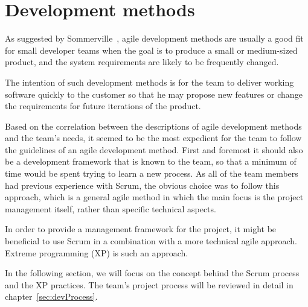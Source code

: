 \section{Development methods}
\label{sec:devMethods}

As suggested by Sommerville~\cite{scrum}, agile development methods are usually a good fit for small developer teams when the goal is to produce a small or medium-sized product, and the system requirements are likely to be frequently changed.

The intention of such development methods is for the team to deliver working software quickly to the customer so that he may propose new features or change the requirements for future iterations of the product.

Based on the correlation between the descriptions of agile development methods and the team's needs, it seemed to be the most expedient for the team to follow the guidelines of an agile development method. First and foremost it should also be a development framework that is known to the team, so that a minimum of time would be spent trying to learn a new process. As all of the team members had previous experience with Scrum, the obvious choice was to follow this approach, which is a general agile method in which the main focus is the project management itself, rather than specific technical aspects.

In order to provide a management framework for the project, it might be beneficial to use Scrum in a combination with a more technical agile approach. Extreme programming (XP) is such an approach.

In the following section, we will focus on the concept behind the Scrum process and the XP practices. The team's project process will be reviewed in detail in chapter~\ref{sec:devProcess}.
